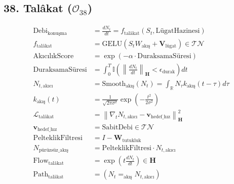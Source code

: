 \documentclass[11pt, a4paper]{article}
\begin{document}
\subsection{38. Talâkat ($\mathcal{O}_{38}$)}
\begin{align}
\text{Debi}_{\text{konuşma}} &= \frac{d N_t}{d t} = f_{\text{talâkat}}(S_t, \text{LügatHazinesi}) \\
f_{\text{talâkat}} &= \text{GELU}(S_t W_{\text{akış}} + \mathbf{V}_{\text{lügat}}) \in \mathcal{T}\mathcal{N} \\
\text{AkıcılıkScore} &= \exp\left( -\alpha \cdot \text{DuraksamaSüresi} \right) \\
\text{DuraksamaSüresi} &= \int_0^T \mathbb{I}\left( \left\|\frac{d N_t}{d t}\right\|_{\mathbf{H}} < \epsilon_{\text{durak}} \right) dt \\
N_{t, \text{akıcı}} &= \text{Smooth}_{\text{akış}}(N_t) = \int_{\mathbb{R}} N_\tau k_{\text{akış}}(t-\tau) d\tau \\
k_{\text{akış}}(t) &= \frac{1}{\sqrt{2\pi \sigma^2}} \exp\left( -\frac{t^2}{2\sigma^2} \right) \\
\mathcal{L}_{\text{talâkat}} &= \left\| \nabla_t N_{t, \text{akıcı}} - \mathbf{v}_{\text{hedef\_hız}} \right\|_{\mathbf{H}}^2 \\
\mathbf{v}_{\text{hedef\_hız}} &= \text{SabitDebi} \in \mathcal{T}\mathcal{N} \\
\text{PelteklikFiltresi} &= I - \mathbf{W}_{\text{tutukluk}} \\
N_{\text{pürüzsüz\_akış}} &= \text{PelteklikFiltresi} \cdot N_{t, \text{akıcı}} \\
\text{Flow}_{\text{talâkat}} &= \exp\left( t \frac{d N_t}{dt} \right) \in \mathbf{H} \\
\text{Path}_{\text{talâkat}} &= (N_t =_{\text{akış}} N_{t, \text{akıcı}})
\end{align}
\end{document}
